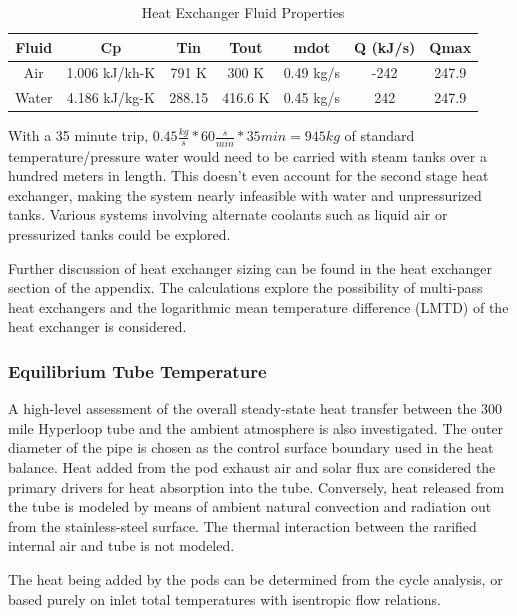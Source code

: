\documentclass[heading.tex]{subfiles}
\begin{document}
\begin{table} [H]
\begin{tabular}{|c|c|c|c|c|c|c|}
\hline 
Fluid & Cp & Tin & Tout & mdot & Q (kJ/s) & Qmax \\ 
\hline 
Air & 1.006 kJ/kh-K & 791 K & 300 K & 0.49 kg/s & -242 & 247.9 \\ 
\hline 
Water & 4.186 kJ/kg-K & 288.15 & 416.6 K  & 0.45 kg/s & 242 & 247.9 \\ 
\hline 
\end{tabular} 
 \caption{Heat Exchanger Fluid Properties}
\end{table}

With a 35 minute trip, $0.45 \frac{kg}{s} * 60 \frac{s}{min} * 35min = 945 kg$ of standard temperature/pressure water would need to be carried 
with steam tanks over a hundred meters in length. This doesn't even account for the second stage heat exchanger, making the system nearly infeasible
with water and unpressurized tanks. Various systems involving alternate coolants such as liquid air or pressurized tanks could be explored.

Further discussion of heat exchanger sizing can be found in the heat exchanger section of the appendix.
The calculations explore the possibility of multi-pass heat exchangers
and the logarithmic mean temperature difference (LMTD) of the heat exchanger is considered.

\subsubsection{Equilibrium Tube Temperature}
A high-level assessment of the overall steady-state heat transfer between the 300 mile Hyperloop tube and the ambient atmosphere is
also investigated. The outer diameter of the pipe is chosen as the control surface boundary used in the heat balance. Heat added from the pod exhaust
air and solar flux are considered the primary drivers for heat absorption into the tube. Conversely, heat released from the tube is modeled by means of
ambient natural convection and radiation out from the stainless-steel surface. The thermal interaction between the rarified internal air and
tube is not modeled.

The heat being added by the pods can be determined from the cycle analysis, or based purely on inlet total temperatures with isentropic
flow relations.
\end{document}
